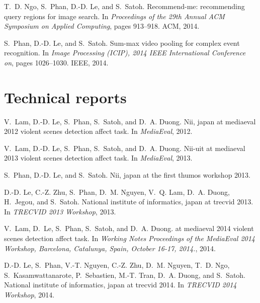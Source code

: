 \begin{thebibliography}{10}
T.~D. Ngo, S.~Phan, D.-D. Le, and S.~Satoh.
\newblock Recommend-me: recommending query regions for image search.
\newblock In {\em Proceedings of the 29th Annual ACM Symposium on Applied
  Computing}, pages 913--918. ACM, 2014.

S.~Phan, D.-D. Le, and S.~Satoh.
\newblock Sum-max video pooling for complex event recognition.
\newblock In {\em Image Processing (ICIP), 2014 IEEE International Conference
  on}, pages 1026--1030. IEEE, 2014.


\section*{Technical reports}

V.~Lam, D.-D. Le, S.~Phan, S.~Satoh, and D.~A. Duong.
\newblock Nii, japan at mediaeval 2012 violent scenes detection affect task.
\newblock In {\em MediaEval}, 2012.

V.~Lam, D.-D. Le, S.~Phan, S.~Satoh, and D.~A. Duong.
\newblock Nii-uit at mediaeval 2013 violent scenes detection affect task.
\newblock In {\em MediaEval}, 2013.

S.~Phan, D.-D. Le, and S.~Satoh.
\newblock Nii, japan at the first thumos workshop 2013.

D.-D. Le, C.-Z. Zhu, S.~Phan, D.~M. Nguyen, V.~Q. Lam, D.~A. Duong, H.~Jegou,
  and S.~Satoh.
\newblock National institute of informatics, japan at trecvid 2013.
\newblock In {\em TRECVID 2013 Workshop}, 2013.

V.~Lam, D.~Le, S.~Phan, S.~Satoh, and D.~A. Duong.
 at mediaeval 2014 violent scenes detection affect task.
\newblock In {\em Working Notes Proceedings of the MediaEval 2014 Workshop,
  Barcelona, Catalunya, Spain, October 16-17, 2014.}, 2014.

D.-D. Le, S.~Phan, V.-T. Nguyen, C.-Z. Zhu, D.~M. Nguyen, T.~D. Ngo,
  S.~Kasamwattanarote, P.~Sebastien, M.-T. Tran, D.~A. Duong, and S.~Satoh.
\newblock National institute of informatics, japan at trecvid 2014.
\newblock In {\em TRECVID 2014 Workshop}, 2014.

\end{thebibliography}
